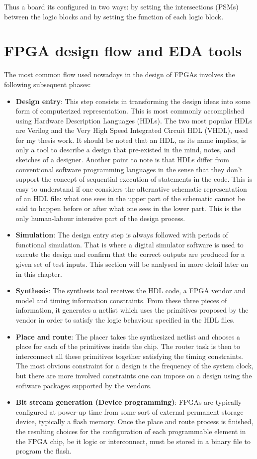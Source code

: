 \noindent Thus a board its configured in two ways: by setting the intersections (PSMs) between the logic blocks and by setting the function of each logic block.

\section{FPGA design flow and EDA tools}
\noindent The most common flow used nowadays in the design of FPGAs involves the following
subsequent phases:
\begin{itemize}
	\item \textbf{Design entry}: This step consists in transforming the design ideas into some form of
	computerized representation. This is most commonly accomplished using Hardware Description
	Languages (HDLs). The two most popular HDLs are Verilog and the Very High Speed
	Integrated Circuit HDL (VHDL), used for my thesis work. It should be noted that an HDL, as its name implies, is only
	a tool to describe a design that pre-existed in the mind, notes, and sketches of a designer. Another point to note is that HDLs differ from
	conventional software programming languages in the sense that they don’t support the concept
	of sequential execution of statements in the code. This is easy to understand if one considers the
	alternative schematic representation of an HDL file: what one sees in the upper part of the
	schematic cannot be said to happen before or after what one sees in the lower part.
	This is the only human-labour intensive part of the design process.
	\item \textbf{Simulation}: The design entry step is always followed with periods of functional simulation. That is where a digital simulator software is used to execute the design and confirm that the correct outputs are produced for a given set of test inputs\cite{fpga4}. This section will be analysed in more detail later on in this chapter.
	\item \textbf{Synthesis}: The synthesis tool receives the HDL code, a FPGA vendor and model and timing information constraints. From
	these three pieces of information, it generates a netlist which uses the primitives proposed by the
	vendor in order to satisfy the logic behaviour specified in the HDL files.
	\item \textbf{Place and route}: The placer takes the synthesized netlist and chooses a place for each of the
	primitives inside the chip. The router task is then to interconnect all these primitives together
	satisfying the timing constraints. The most obvious constraint for a design is the frequency of
	the system clock, but there are more involved constraints one can impose on a design using the
	software packages supported by the vendors.
	\item \textbf{Bit stream generation (Device programming)}: FPGAs are typically configured at power-up time from some sort of
	external permanent storage device, typically a flash memory. Once the place and route process is
	finished, the resulting choices for the configuration of each programmable element in the FPGA
	chip, be it logic or interconnect, must be stored in a binary file to program the flash.
	
\end{itemize}

